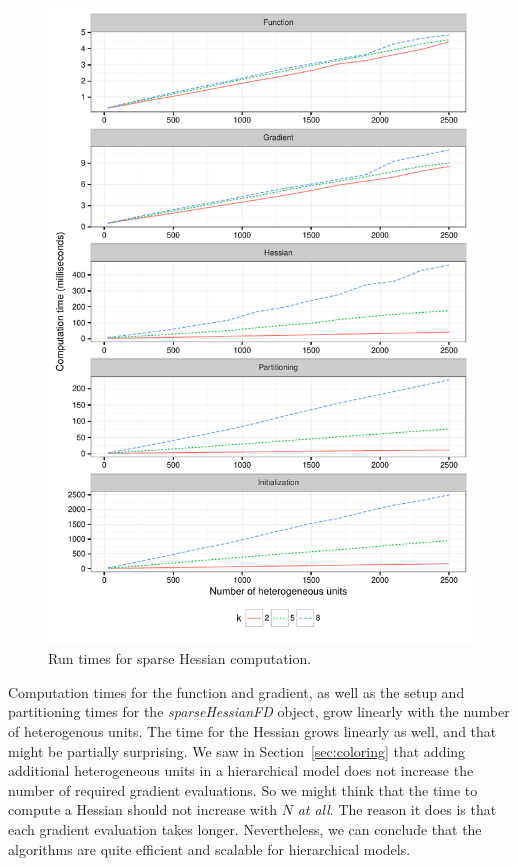 \documentclass[jss]{jss}\usepackage[]{graphicx}\usepackage[]{color}
\newcommand{\class}[1]{\textsl{#1}}
\begin{document}
\begin{figure}[tbp]
  \centering
\includegraphics{fig_timings}
  \caption{Run times for sparse Hessian computation.}
  \label{fig:timing}
\end{figure}

Computation times
for the function and gradient, as well as the setup and
partitioning times for the \class{sparseHessianFD} object, grow
linearly with the number of heterogenous units.  The time
for the Hessian grows linearly as well, and that might be partially
surprising.  We saw in Section~\ref{sec:coloring} that adding
additional heterogeneous units in a hierarchical model does not
increase the number of required gradient evaluations.  So we might
think that the time
to compute a Hessian should not increase with $N$ \emph{at all}.  The
reason it does is that each gradient evaluation takes longer.
Nevertheless, we can conclude that the
 algorithms are quite efficient and scalable for
hierarchical models.

\FloatBarrier

\end{document}
